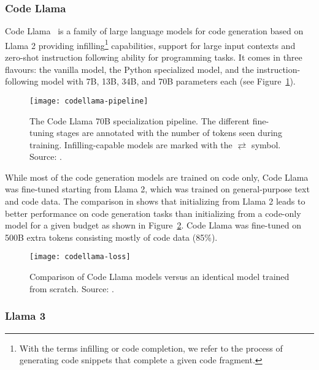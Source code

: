 \subsubsection{Code Llama}
\label{subsubsec:code-llama}

Code Llama~\cite{roziere2024codellamaopenfoundation} is a family of large language models for code generation based on Llama 2 providing infilling\footnote{With the terms infilling or code completion, we refer to the process of generating code snippets that complete a given code fragment.} capabilities, support
for large input contexts and zero-shot instruction following ability for programming tasks.
It comes in three flavours: the vanilla model, the Python specialized model, and the instruction-following model with 7B, 13B, 34B, and 70B parameters each (see Figure~\ref{fig:code-llama}).

\begin{figure}[h!]
	\centering
	\texttt{[image: codellama-pipeline]}
	\caption{The Code Llama 70B specialization pipeline. The different fine-tuning stages are annotated with the number of tokens seen during training. Infilling-capable models are marked with the $\rightleftarrows$ symbol. Source: \textcite{roziere2024codellamaopenfoundation}.}
	\label{fig:code-llama}
\end{figure}

While most of the code generation models are trained on code only, Code Llama was fine-tuned starting from Llama 2, which was trained on general-purpose text and code data.
The comparison in \textcite{roziere2024codellamaopenfoundation} shows that initializing from Llama 2 leads to better performance on code generation tasks than initializing from a code-only model for a given budget as shown in Figure~\ref{fig:code-llama-comparison}.
Code Llama was fine-tuned on 500B extra tokens consisting mostly of code data (85\%).

\begin{figure}[ht!]
	\centering
	\texttt{[image: codellama-loss]}
	\caption{Comparison of Code Llama models versus an identical model trained from scratch. Source: \textcite{roziere2024codellamaopenfoundation}.}
	\label{fig:code-llama-comparison}
\end{figure}

\subsubsection{Llama 3}
\label{subsubsec:llama-3}

